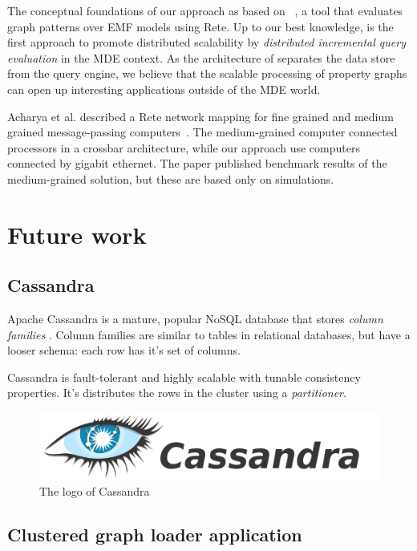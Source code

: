 The conceptual foundations of our approach as based on \incquery{}~\cite{models10}, a tool that evaluates graph patterns over EMF models using Rete. Up to our best knowledge, \incqueryD{} is the first approach to promote distributed scalability by \emph{distributed incremental query evaluation} in the MDE context. As the architecture of \incqueryD{} separates the data store from the query engine, we believe that the scalable processing of property graphs can open up interesting applications outside of the MDE world.


Acharya et al. described a Rete network mapping for fine grained and medium grained message-passing computers~\cite{message-passing-rete}. The medium-grained computer connected processors in a crossbar architecture, while our approach use computers connected by gigabit ethernet. The paper published benchmark results of the medium-grained solution, but these are based only on simulations.

\section{Future work}

\subsection{Cassandra}

Apache Cassandra is a mature, popular NoSQL database that stores \textit{column families} \cite{Cassandra}. Column families are similar to tables in relational databases, but have a looser schema: each row has it's set of columns.

Cassandra is fault-tolerant and highly scalable with tunable consistency properties. It's distributes the rows in the cluster using a \textit{partitioner}.

\begin{figure}
\begin{center}
\includegraphics[]{figures/cassandra-logo}
\caption{The logo of Cassandra}
\label{fig:cassandra-logo}
\end{center}
\end{figure}


\subsection{Clustered graph loader application}

